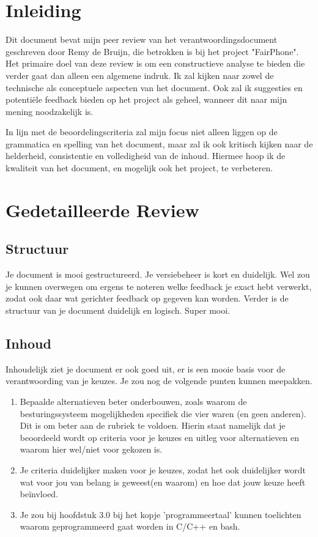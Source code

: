 \documentclass[a4paper]{article}
\begin{document}
\tableofcontents
\clearpage

\section{Inleiding}
Dit document bevat mijn peer review van het verantwoordingsdocument geschreven door Remy de Bruijn, die betrokken is bij het project "FairPhone". 
Het primaire doel van deze review is om een constructieve analyse te bieden die verder gaat dan alleen een algemene indruk. 
Ik zal kijken naar zowel de technische als conceptuele aspecten van het document. Ook zal ik suggesties en potentiële feedback bieden op het project als geheel, wanneer dit naar mijn mening noodzakelijk is.
\par \smallskip
In lijn met de beoordelingscriteria zal mijn focus niet alleen liggen op de grammatica en spelling van het document, maar zal ik ook kritisch kijken naar de helderheid, consistentie en volledigheid van de inhoud.
Hiermee hoop ik de kwaliteit van het document, en mogelijk ook het project, te verbeteren.

\section{Gedetailleerde Review}
\subsection{Structuur}
Je document is mooi gestructureerd. Je versiebeheer is kort en duidelijk. 
Wel zou je kunnen overwegen om ergens te noteren welke feedback je exact hebt verwerkt, zodat ook daar wat gerichter feedback op gegeven kan worden.
Verder is de structuur van je document duidelijk en logisch. Super mooi.

\subsection{Inhoud}
Inhoudelijk ziet je document er ook goed uit, er is een mooie basis voor de verantwoording van je keuzes.
Je zou nog de volgende punten kunnen meepakken.
\begin{enumerate}
  \item Bepaalde alternatieven beter onderbouwen, zoals waarom de besturingssysteem mogelijkheden specifiek die vier waren (en geen anderen). Dit is om beter aan de rubriek te voldoen. Hierin staat namelijk dat je beoordeeld wordt op criteria voor je keuzes en uitleg voor alternatieven en waarom hier wel/niet voor gekozen is.
  \item Je criteria duidelijker maken voor je keuzes, zodat het ook duidelijker wordt wat voor jou van belang is geweest(en waarom) en hoe dat jouw keuze heeft beïnvloed.
  \item Je zou bij hoofdstuk 3.0 bij het kopje 'programmeertaal' kunnen toelichten waarom geprogrammeerd gaat worden in C/C++ en bash.
\end{enumerate}
\end{document}

